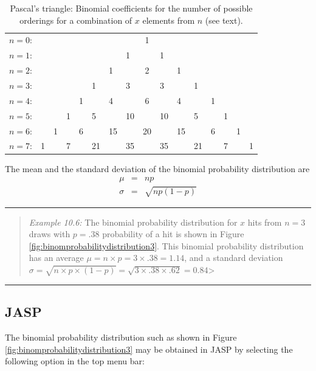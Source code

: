 \documentclass[
]{book}
\begin{document}
\begin{longtable}[]{@{}llllllllclllllll@{}}
\caption{\label{tab:pascaltriangle} Pascal's triangle: Binomial coefficients for the
number of possible orderings for a combination of \(x\) elements from \(n\) (see text).}\tabularnewline
\toprule
\endhead
\(n= 0\): & & & & & & & & 1 & & & & & & &\tabularnewline
\(n= 1\): & & & & & & & 1 & & 1 & & & & & &\tabularnewline
\(n= 2\): & & & & & & 1 & & 2 & & 1 & & & & &\tabularnewline
\(n= 3\): & & & & & 1 & & 3 & & 3 & & 1 & & & &\tabularnewline
\(n= 4\): & & & & 1 & & 4 & & 6 & & 4 & & 1 & & &\tabularnewline
\(n= 5\): & & & 1 & & 5 & & 10 & & 10 & & 5 & & 1 & &\tabularnewline
\(n= 6\): & & 1 & & 6 & & 15 & & 20 & & 15 & & 6 & & 1 &\tabularnewline
\(n= 7\): & 1 & & 7 & & 21 & & 35 & & 35 & & 21 & & 7 & & 1\tabularnewline
\bottomrule
\end{longtable}

The mean and the standard deviation of the binomial probability distribution
are \[\begin{aligned}
    \mu & = & np \\
    \sigma & = & \sqrt{ np(1-p) }\end{aligned}\]

\begin{center}\rule{0.5\linewidth}{0.5pt}\end{center}

\begin{quote}
\emph{Example 10.6:}
The binomial probability distribution for \(x\) hits from \(n=3\) draws with
\(p=.38\) probability of a hit is shown in
Figure \ref{fig:binomprobabilitydistribution3}. This binomial probability
distribution has an average \(\mu=n \times p = 3 \times .38 = 1.14\), and a
standard deviation
\(\sigma = \sqrt{n \times p \times (1-p)} = \sqrt{ 3 \times .38 \times .62} = 0.84\)\textgreater{}
\end{quote}

\begin{center}\rule{0.5\linewidth}{0.5pt}\end{center}

\hypertarget{jasp-4}{%
\subsection{JASP}\label{jasp-4}}

The binomial probability distribution such as shown in Figure \ref{fig:binomprobabilitydistribution3} may be obtained in JASP by selecting the following option in the top menu bar:
\end{document}
